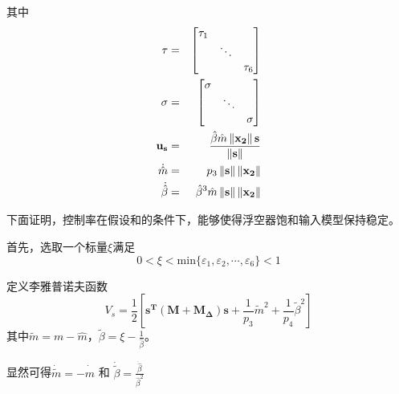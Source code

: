其中
\begin{eqnarray}
        \tau &=& \left[\begin{matrix}
         \tau_1&&  \\
         &\ddots& \\
         &&\tau_6
    \end{matrix}\right] \nonumber\\
    \sigma &=& \left[\begin{matrix}
         \sigma&&  \\
         &\ddots& \\
         &&\sigma
    \end{matrix}\right] \nonumber\\
    \mathbf{u_s}&=&\frac{\hat{\beta}\hat{m}\left\lVert\mathbf{x_2}\right\rVert\mathbf{s}}{\left\lVert\mathbf{s}\right\rVert} \\
    \dot{\hat{m}} &=& p_3\left\lVert\mathbf{s}\right\rVert\left\lVert\mathbf{x_2}\right\rVert \label{eq:updatead1} \\
    \dot{\hat{\beta}} &=& \hat{\beta}^3\hat{m}\left\lVert\mathbf{s}\right\rVert\left\lVert\mathbf{x_2}\right\rVert \label{eq:updatead2}
\end{eqnarray}

下面证明，控制率在假设和的条件下，能够使得浮空器饱和输入模型保持稳定。

首先，选取一个标量$\xi$满足
\begin{equation}\label{eq:choosexi}
    0<\xi<\mbox{min}\{\varepsilon_1,\varepsilon_2,\cdots,\varepsilon_6\}<1
\end{equation}

定义李雅普诺夫函数
\begin{equation}\label{eq:lyapads}
    V_s=\frac{1}{2}\left[\mathbf{s^T(M+M_{\Delta})s}+\frac{1}{p_3}\tilde{m}^2+\frac{1}{p_4}\tilde{\beta}^2\right]
\end{equation}
其中$\tilde{m}=m-\hat{m}$，$\tilde{\beta}=\xi-\frac{1}{\hat{\beta}}$。

显然可得$\dot{\tilde{m}}=-\dot{\hat{m}}$ 和 $\dot{\tilde{\beta}}=\frac{\dot{\hat{\beta}}}{\hat{\beta}^2}$

